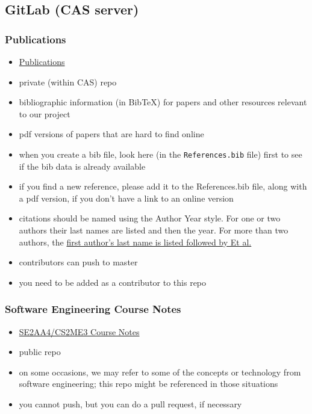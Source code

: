 \documentclass[12pt]{article}
\begin{document}
\subsection{GitLab (CAS server)}

\subsubsection{Publications}
\begin{itemize}
\item \href{https://gitlab.cas.mcmaster.ca/smiths/pub} {Publications}
\item private (within CAS) repo
\item bibliographic information (in BibTeX) for papers and other resources
relevant to our project
\item pdf versions of papers that are hard to find online
\item when you create a bib file, look here (in the \texttt{References.bib}
file) first to see if the bib data is already available
\item if you find a new reference, please add it to the References.bib file,
along with a pdf version, if you don't have a link to an online version
\item citations should be named using the Author Year style.  For one or two
authors their last names are listed and then the year.  For more than two
authors, the
\href{https://www.mcgill.ca/library/files/library/cse-name-year-citation-style-guide.pdf}
{first author's last name is listed followed by Et al.}
\item contributors can push to master
\item you need to be added as a contributor to this repo
\end{itemize}

\subsubsection{Software Engineering Course Notes}
\begin{itemize}
\item \href{https://gitlab.cas.mcmaster.ca/smiths/se2aa4_cs2me3} {SE2AA4/CS2ME3 Course Notes}
\item public repo
\item on some occasions, we may refer to some of the concepts or technology from
software engineering; this repo might be referenced in those situations
\item you cannot push, but you can do a pull request, if necessary
\end{itemize}
\end{document}
